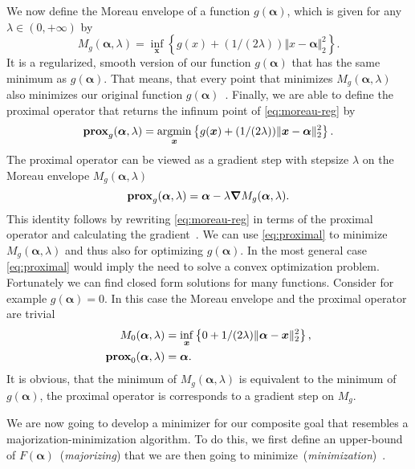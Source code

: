 We now define the Moreau envelope of a function \(g (\bm{\alpha})\), which is given for any \(\lambda \in (0, +\infty)\) by
\begin{equation}
  \label{eq:moreau-reg}
  M_{g}(\bm{\alpha}, \lambda) = \inf_{\bm{x}} \left\{  g(x) + (1/(2\lambda)) \Vert x - \bm{\alpha} \Vert_2^2 \right\}.
\end{equation}
It is a regularized, smooth version of our function \(g(\bm{\alpha})\) that has the
same minimum as \(g(\bm{\alpha})\).
That means, that every point that minimizes \(M_{g}(\bm{\alpha}, \lambda)\) also
minimizes our original function \(g (\bm{\alpha})\)~\cite{proxsurvey}.
Finally, we are able to define the proximal operator that returns the infinum
point of \cref{eq:moreau-reg} by
\begin{equation}
  \label{eq:proximal}
  \prox[\(g\)]{\bm{\alpha}}{\lambda}= \argmin_{\bm{x}} \left\{ g (\bm{x}) + (1/ (2 \lambda)) \Vert \bm{x} - \bm{\alpha} \Vert_2^2 \right\}.
\end{equation}
The proximal operator can be viewed as a gradient step with stepsize \(\lambda\) on the Moreau envelope
\(M_g(\bm{\alpha}, \lambda)\)
\begin{equation*}
  \prox[\(g\)]{\bm{\alpha}}{\lambda} = \bm{\alpha} - \lambda \bm{\nabla} M_{g}(\bm{\alpha}, \lambda).
\end{equation*}
This identity follows by rewriting \cref{eq:moreau-reg} in terms of the proximal operator and calculating the gradient~\cite{proxsurvey}.
We can use \cref{eq:proximal} to minimize \(M_g(\bm{\alpha}, \lambda)\) and
thus also for optimizing \(g(\bm{\alpha})\).
In the most general case \cref{eq:proximal} would imply the need to solve a convex optimization problem.
Fortunately we can find closed form solutions for many functions.
Consider for example \(g(\bm{\alpha}) = 0\).
In this case the Moreau envelope and the proximal operator are trivial
\begin{align*}
 M_{0}(\bm{\alpha}, \lambda) &= \inf_{\bm{x}} \left\{ 0 + 1/(2 \lambda) \Vert \bm{\alpha} - \bm{x} \Vert_2^2 \right\}, \\
 \prox[\(0\)]{\bm{\alpha}}{\lambda} &= \bm{\alpha}.
\end{align*}
It is obvious, that the minimum of \(M_g(\bm{\alpha}, \lambda)\) is equivalent to the minimum of \(g(\bm{\alpha})\), the proximal operator is corresponds to a gradient step on \(M_g\).

We are now going to develop a minimizer for our composite goal that resembles a majorization-minimization algorithm.
To do this, we first define an upper-bound of \(F(\bm{\alpha})\)~(\emph{majorizing}) that we are then going to minimize~(\emph{minimization})~\autocite{proxsurvey}.

